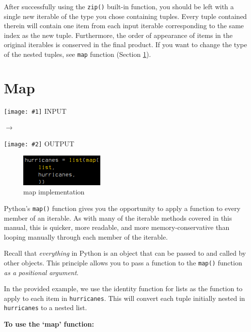 \documentclass[12pt]{article}
\newcommand{\bna}[2]{
        \begin{minipage}[c]{.4\textwidth}
		\begin{center}
		\texttt{[image: \#1]}
		\textsc{INPUT}
		\end{center}
        \end{minipage}
	\begin{minipage}[c]{.1\textwidth}
		\center\LARGE$\longrightarrow$
	\end{minipage}
        \begin{minipage}[c]{.4\textwidth}
		\begin{center}
		\texttt{[image: \#2]}
		\textsc{OUTPUT}
		\end{center}
        \end{minipage}\vspace{.12in}
        }
\begin{document}
\noindent
After successfully using the \texttt{zip()} built-in function, you should be left with a single new iterable of the type you chose containing tuples. Every tuple contained therein will contain one item from each input iterable corresponding to the same index as the new tuple. Furthermore, the order of appearance of items in the original iterables is conserved in the final product. If you want to change the type of the nested tuples, see \texttt{map} function (Section \ref{map}).


\newpage
\section{Map}
\label{map}

\begin{center}
\bna{./figures/2_map/in_map.png}{./figures/2_map/out_map.png}
\end{center}

\begin{figure}
	\begin{center}
		\includegraphics[width=.38\textwidth]{./figures/2_map/codeblock_map.png}
		\caption{map implementation}
		\label{map code} %
	\end{center}
\end{figure}

Python's \texttt{map()} function gives you the opportunity to apply a function to every member of an iterable. As with many of the iterable methods covered in this manual, this is quicker, more readable, and more memory-conservative than looping manually through each member of the iterable.

Recall that \textit{everything} in Python is an object that can be passed to and called by other objects. This principle allows you to pass a function to the \texttt{map()} function \textit{as a positional argument}.

In the provided example, we use the identity function for lists as the function to apply to each item in \texttt{hurricanes}. This will convert each tuple initially nested in \texttt{hurricanes} to a nested list.

\vspace{1em}
\noindent
\textbf{To use the `map' function:}
\end{document}
